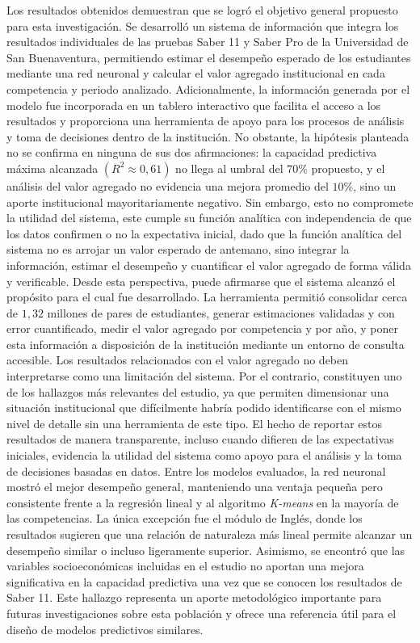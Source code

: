 Los resultados obtenidos demuestran que se logró el objetivo general propuesto para esta investigación. Se desarrolló un sistema de información que integra los resultados individuales de las pruebas Saber 11 y Saber Pro de la Universidad de San Buenaventura, permitiendo estimar el desempeño esperado de los estudiantes mediante una red neuronal y calcular el valor agregado institucional en cada competencia y periodo analizado. Adicionalmente, la información generada por el modelo fue incorporada en un tablero interactivo que facilita el acceso a los resultados y proporciona una herramienta de apoyo para los procesos de análisis y toma de decisiones dentro de la institución.
No obstante, la hipótesis planteada no se confirma en ninguna de sus dos afirmaciones: la capacidad predictiva máxima alcanzada $(R^2 \approx 0,61)$ no llega al umbral del $70\%$ propuesto, y el análisis del valor agregado no evidencia una mejora promedio del $10\%$, sino un aporte institucional mayoritariamente negativo. Sin embargo, esto no compromete la utilidad del sistema, este cumple su función analítica con independencia de que los datos confirmen o no la expectativa inicial, dado que la función analítica del sistema no es arrojar un valor esperado de antemano, sino integrar la información, estimar el desempeño y cuantificar el valor agregado de forma válida y verificable. Desde esta perspectiva, puede afirmarse que el sistema alcanzó el propósito para el cual fue desarrollado. La herramienta permitió consolidar cerca de $1,32$ millones de pares de estudiantes, generar estimaciones validadas y con error cuantificado, medir el valor agregado por competencia y por año, y poner esta información a disposición de la institución mediante un entorno de consulta accesible. Los resultados relacionados con el valor agregado no deben interpretarse como una limitación del sistema. Por el contrario, constituyen uno de los hallazgos más relevantes del estudio, ya que permiten dimensionar una situación institucional que difícilmente habría podido identificarse con el mismo nivel de detalle sin una herramienta de este tipo. El hecho de reportar estos resultados de manera transparente, incluso cuando difieren de las expectativas iniciales, evidencia la utilidad del sistema como apoyo para el análisis y la toma de decisiones basadas en datos. 
Entre los modelos evaluados, la red neuronal mostró el mejor desempeño general, manteniendo una ventaja pequeña pero consistente frente a la regresión lineal y al algoritmo \textit{K-means} en la mayoría de las competencias. La única excepción fue el módulo de Inglés, donde los resultados sugieren que una relación de naturaleza más lineal permite alcanzar un desempeño similar o incluso ligeramente superior. Asimismo, se encontró que las variables socioeconómicas incluidas en el estudio no aportan una mejora significativa en la capacidad predictiva una vez que se conocen los resultados de Saber 11. Este hallazgo representa un aporte metodológico importante para futuras investigaciones sobre esta población y ofrece una referencia útil para el diseño de modelos predictivos similares.
